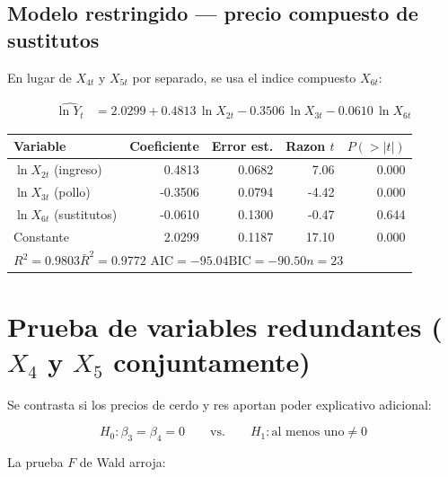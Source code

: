 \documentclass[12pt, letterpaper]{article}
\begin{document}
\subsection{Modelo restringido --- precio compuesto de sustitutos}

En lugar de $X_{4t}$ y $X_{5t}$ por separado, se usa el indice compuesto $X_{6t}$:

\begin{align}
  \widehat{\ln Y_t} &= 2.0299 + 0.4813\,\ln X_{2t} - 0.3506\,\ln X_{3t}
                       - 0.0610\,\ln X_{6t}
  \label{eq:estimB}
\end{align}

\begin{center}
\renewcommand{\arraystretch}{1.3}
\small
\begin{tabular}{lrrrr}
\toprule
\textbf{Variable} & \textbf{Coeficiente} & \textbf{Error est.} & \textbf{Razon $t$} & \textbf{$P(>|t|)$} \\
\midrule
$\ln X_{2t}$ (ingreso)     &  0.4813 & 0.0682 &  7.06 & 0.000 \\
$\ln X_{3t}$ (pollo)       & -0.3506 & 0.0794 & -4.42 & 0.000 \\
$\ln X_{6t}$ (sustitutos)  & -0.0610 & 0.1300 & -0.47 & 0.644 \\
Constante                  &  2.0299 & 0.1187 & 17.10 & 0.000 \\
\midrule
\multicolumn{5}{l}{$R^2 = 0.9803$\quad $\bar{R}^2 = 0.9772$\quad
  $\text{AIC} = -95.04$\quad $\text{BIC} = -90.50$\quad $n = 23$} \\
\bottomrule
\end{tabular}
\end{center}

\section{Prueba de variables redundantes ($X_4$ y $X_5$ conjuntamente)}

Se contrasta si los precios de cerdo y res aportan poder explicativo adicional:

\begin{equation}
  H_0: \beta_3 = \beta_4 = 0
  \qquad \text{vs.} \qquad
  H_1: \text{al menos uno} \neq 0
\end{equation}

La prueba $F$ de Wald arroja:
\end{document}
